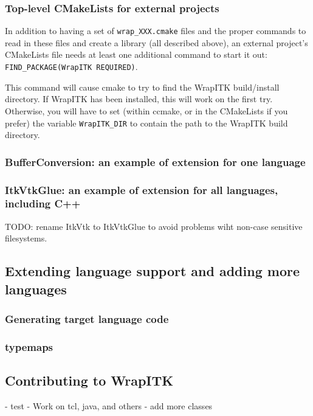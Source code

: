 \documentclass{InsightArticle}
\begin{document}
    \subsubsection{Top-level CMakeLists for external projects}
In addition to having a set of \verb$wrap_XXX.cmake$ files and the proper
commands to read in these files and create a library (all described above), an
external project's CMakeLists file needs at least one additional command to
start it out: \verb$FIND_PACKAGE(WrapITK REQUIRED)$.

This command will cause cmake to try to find the WrapITK build/install
directory. If WrapITK has been installed, this will work on the first try.
Otherwise, you will have to set (within ccmake, or in the CMakeLists if you
prefer) the variable \verb$WrapITK_DIR$ to contain the path to the WrapITK build
directory.

    \subsubsection{BufferConversion: an example of extension for one language}

    \subsubsection{ItkVtkGlue: an example of extension for all languages, including C++}

TODO: rename ItkVtk to ItkVtkGlue to avoid problems wiht non-case sensitive filesystems.

  \subsection{Extending language support and adding more languages}

    \subsubsection{Generating target language code}

    \subsubsection{typemaps}

  \subsection{Contributing to WrapITK}

- test
- Work on tcl, java, and others
- add more classes
\end{document}
